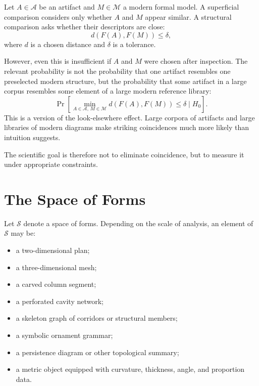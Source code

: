 \documentclass[11pt,a4paper]{article}
\DeclareMathOperator{\Prob}{Pr}
\begin{document}
Let $A \in \mathcal{A}$ be an artifact and $M \in \mathcal{M}$ a modern formal model. A superficial comparison considers only whether $A$ and $M$ appear similar. A structural comparison asks whether their descriptors are close:
\begin{equation}
    d(F(A),F(M)) \leq \delta,
\end{equation}
where $d$ is a chosen distance and $\delta$ is a tolerance.

However, even this is insufficient if $A$ and $M$ were chosen after inspection. The relevant probability is not the probability that one artifact resembles one preselected modern structure, but the probability that some artifact in a large corpus resembles some element of a large modern reference library:
\begin{equation}
    \Prob\left[\min_{A \in \mathcal{A},\, M \in \mathcal{M}} d(F(A),F(M)) \leq \delta \mid H_0\right].
\end{equation}
This is a version of the look-elsewhere effect. Large corpora of artifacts and large libraries of modern diagrams make striking coincidences much more likely than intuition suggests.

The scientific goal is therefore not to eliminate coincidence, but to measure it under appropriate constraints.

\section{The Space of Forms}

Let $\mathcal{S}$ denote a space of forms. Depending on the scale of analysis, an element of $\mathcal{S}$ may be:
\begin{itemize}
    \item a two-dimensional plan;
    \item a three-dimensional mesh;
    \item a carved column segment;
    \item a perforated cavity network;
    \item a skeleton graph of corridors or structural members;
    \item a symbolic ornament grammar;
    \item a persistence diagram or other topological summary;
    \item a metric object equipped with curvature, thickness, angle, and proportion data.
\end{itemize}
\end{document}
